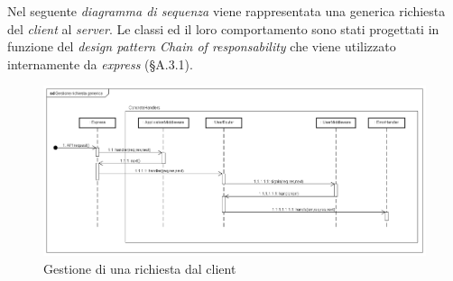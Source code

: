 Nel seguente \textit{diagramma di sequenza} viene rappresentata una generica richiesta del \textit{client} al \textit{server}. Le classi ed il loro comportamento sono stati progettati in funzione del \textit{design pattern} \textit{Chain of responsability} che viene utilizzato internamente da \textit{express} (§A.3.1).

\label{Gestione richiesta generica}
\begin{figure}[ht]
	\centering
	\includegraphics[scale=0.39]{UML/DiagrammiDiSequenza/Back-end/GestioneRichiestaGenerica.png}
	\caption{Gestione di una richiesta dal client}
\end{figure}
\FloatBarrier
